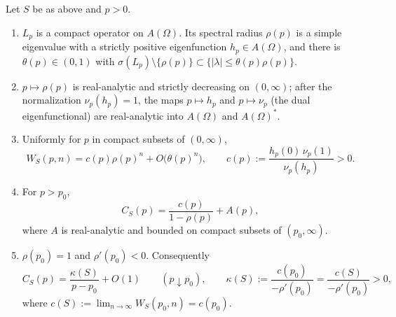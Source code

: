 \begin{lemma}\label{lem:pole}
Let $S$ be as above and $p>0$.
\begin{enumerate}[label=\textup{(\alph*)},leftmargin=2.2em]
\item $L_p$ is a compact operator on $A(\Omega)$. Its spectral radius $\rho(p)$
is a simple eigenvalue with a strictly positive eigenfunction $h_p\in A(\Omega)$,
and there is $\theta(p)\in(0,1)$ with
$\sigma(L_p)\setminus\{\rho(p)\}\subset\{|\lambda|\le\theta(p)\rho(p)\}$.
\item $p\mapsto\rho(p)$ is real-analytic and strictly decreasing on $(0,\infty)$;
after the normalization $\nu_p(h_p)=1$, the maps $p\mapsto h_p$ and
$p\mapsto\nu_p$ (the dual eigenfunctional) are real-analytic into $A(\Omega)$
and $A(\Omega)^*$.
\item Uniformly for $p$ in compact subsets of $(0,\infty)$,
\begin{equation}\label{eq:W-asym}
W_S(p,n)=c(p)\rho(p)^n+O\bigl(\theta(p)^n\bigr),\qquad
c(p):=\frac{h_p(0)\,\nu_p(1)}{\nu_p(h_p)}>0 .
\end{equation}
\item For $p>p_0$,
\begin{equation}\label{eq:C-decomp}
C_S(p)=\frac{c(p)}{1-\rho(p)}+A(p),
\end{equation}
where $A$ is real-analytic and bounded on compact subsets of $(p_0,\infty)$.
\item $\rho(p_0)=1$ and $\rho'(p_0)<0$. Consequently
\begin{equation}\label{eq:pole}
C_S(p)=\frac{\kappa(S)}{p-p_0}+O(1)\qquad(p\downarrow p_0),
\qquad
\kappa(S):=\frac{c(p_0)}{-\rho'(p_0)}=\frac{c(S)}{-\rho'(p_0)}>0,
\end{equation}
where $c(S):=\lim_{n\to\infty}W_S(p_0,n)=c(p_0)$.
\end{enumerate}
\end{lemma}

